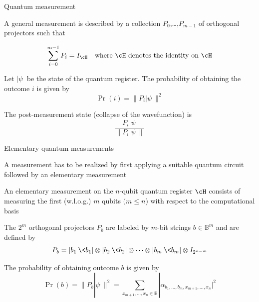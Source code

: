 


\begin{frame}{Quantum measurement}

A general measurement is described by a collection $P_0$,\ldots,$P_{m-1}$ of orthogonal projectors such that 

\[
\sum_{i=0}^{m-1} P_i = I_{\cH}\quad\mbox{where $\cH$ denotes the identity on $\cH$}
\]

\pause

\bigskip

Let $|\psi\>$ be the state of the quantum register.  The probability of obtaining the outcome $i$ is given by
\[
\Pr(i) = \| P_i |\psi\> \|^2
\]

\bigskip

\pause
The post-measurement state (collapse of the wavefunction) is 
\[
\frac{P_i|\psi\>}{\|P_i |\psi\>\|}
\]

\end{frame}




\begin{frame}{Elementary quantum measurements}

A measurement has to be realized by first applying a suitable quantum circuit followed by an elementary measurement

\pause

\bigskip

An elementary measurement on the $n$-qubit quantum register $\cH$ consists of measuring the first (w.l.o.g.) $m$ qubits $(m\le n$) with respect to the computational basis

\pause

\bigskip
The $2^m$ orthogonal projectors $P_b$ are labeled by $m$-bit strings $b\in\mathbb{B}^m$ and are defined by
\[
P_b = |b_1\>\<b_1| \otimes |b_2\>\<b_2| \otimes \cdots \otimes |b_m\>\<b_m| \otimes I_{2^{n-m}}
\]

\pause

\bigskip
The probability of obtaining outcome $b$ is given by
\[
\Pr(b) = \| P_b |\psi\> \|^2 = \sum_{x_{m+1},\ldots,x_n\in\mathbb{B}} |\alpha_{b_1,\ldots,b_m,x_{m+1},\ldots,x_n}|^2
\]

\end{frame}

